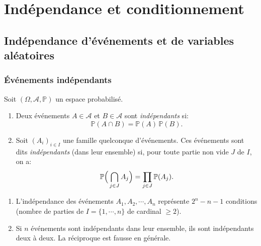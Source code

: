 \chapter{Indépendance et conditionnement}

\sld{\vfill\pagebreak[5]}%


\section[Indépendance]{Indépendance d'événements et de variables aléatoires}

\subsection{Événements indépendants}


\begin{definition}
Soit $(\Omega,\mathcal{A},\mathbb{P})$ un espace probabilisé. 
\begin{enumerate}[label=(\roman*)]
	\item Deux événements $A \in \mathcal{A}$ et $B \in \mathcal{A}$ sont \emph{indépendants} si:
		\begin{equation*}
			\mathbb{P} (A \cap B) = \mathbb{P} (A) \,\mathbb{P} (B).
		\end{equation*}
	\item Soit $(A_i)_{i \in I}$ une famille quelconque d'événements. Ces événements sont dits \emph{indépendants} (dans leur ensemble) si, pour toute partie non vide $J$ de $I$, on a:
		\begin{equation*}
			\mathbb{P} \Big( \bigcap_{j \in J} A_j \Big) = \prod_{j \in J}  \mathbb{P} (A_j).
		\redspace 
		\end{equation*}
\end{enumerate}
\end{definition}

\begin{remark}
	\begin{enumerate}
		\item L'indépendance des événements $A_1, A_2, \cdots, A_n$ représente $2^n - n -1$ conditions (nombre de parties de $I=\{1,\cdots,n\}$ de cardinal $\geq 2$).
		\item Si $n$ événements sont indépendants dans leur ensemble, ils sont indépendants deux à deux. La réciproque est fausse en générale.%
	\end{enumerate}
\end{remark}


